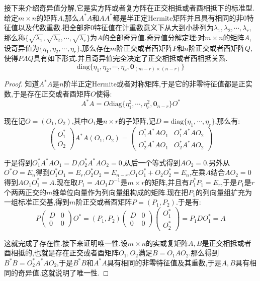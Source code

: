 接下来介绍奇异值分解,它是实方阵或者复方阵在正交相抵或者酉相抵下的标准型.给定$m\times n$的矩阵$A$,那么$A^*A$和$AA^*$都是半正定Hermite矩阵并且具有相同的非0特征值以及代数重数.把全部非0特征值在计重数意义下从大到小排列为$\lambda_1,\lambda_2,\cdots,\lambda_r$,那么称$\{\sqrt{\lambda_1},\sqrt{\lambda_2},\cdots,\sqrt{\lambda_r}\}$为$A$的全部奇异值.奇异值分解定理:对$m\times n$的矩阵$A$,设奇异值为$\{\eta_1,\eta_2,\cdots,\eta_r\}$,那么存在$m$阶正交或者酉矩阵$P$和$n$阶正交或者酉矩阵$Q$,使得$PAQ$具有如下形式.并且奇异值完全决定了正交相抵或者酉相抵关系.
$$\mathrm{diag}\{\eta_1,\eta_2,\cdots,\eta_r,\textbf{0}_{(m-r)\times(n-r)}\}$$
\begin{proof}
	
	知道$A^*A$是$n$阶半正定Hermite或者对称矩阵,于是它的非零特征值都是正实数,于是存在正交或者酉矩阵$O$使得:
	$$A^*A=O\mathrm{diag}\{\eta_1^2,\cdots,\eta_r^2,\textbf{0} _{n-r}\}O^*$$
	
	现在记$O=(O_1,O_2)$,其中$O_1$是$n\times r$的子矩阵,记$D=\mathrm{diag}\{\eta_1,\cdots,\eta_r\}$,那么有:
	$$\left(\begin{array}{c}
	O_1^*\\
	O_2\end{array}\right)A^*A\left(O_1,O_2\right)=\left(\begin{array}{cc}
	O_1^*A^*AO_1&O_1^*A^*AO_2\\
	O_2^*A^*AO_1&O_2^*A^*AO_2\end{array}\right)$$
	
	于是得到$O_1^*A^*AO_1=D$,$O_2^*A^*AO_2=0$,从后一个等式得到$AO_2=0$.另外从$O^*O=E_n$得到$O_1^*O_1=E_r$,$O_2^*O_2=E_{n-r}$,$O_1O_1^*+O_2O_2^*=E_n$,左乘$A$结合$AO_2=0$得到$AO_1O_1^*=A$.现在取$P_1=AO_1D^{-1}$是$m\times r$的矩阵,并且有$P_1^*P_1=E_r$,于是$P_1$是$r$个两两正交的$m$维单位向量作为列向量组构成的矩阵.现在把$P_1$的列向量组扩充为一组标准正交基,得到$m$阶正交或者酉矩阵$P=(P_1,P_2)$.于是有:
	$$P\left(\begin{array}{cc}
	D&0\\
	0&0\end{array}\right)O^*=(P_1,P_2)\left(\begin{array}{cc}
	D&0\\
	0&0\end{array}\right)\left(\begin{array}{c}
	O_1^*\\
	O_2^*\end{array}\right)=P_1DO_1^*=A$$
	
	这就完成了存在性.接下来证明唯一性.设$m\times n$的实或复矩阵$A,B$是正交相抵或者酉相抵的,也就是存在正交或者酉矩阵$O_1,O_2$满足$B=O_1AO_2$.那么得到$B^*B=O_2^*A^*AO_2$,于是$B^*B$和$A^*A$具有相同的非零特征值及其重数,于是$A,B$具有相同的奇异值.这就说明了唯一性.
	
\end{proof}

